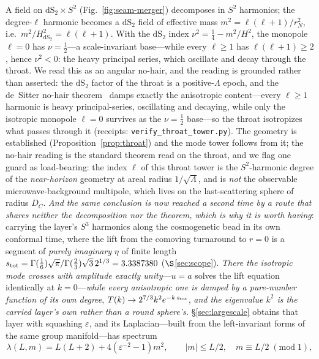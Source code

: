 \documentclass[11pt,a4paper]{article}
\theoremstyle{plain}
\theoremstyle{definition}
\theoremstyle{remark}
\newcommand{\dS}{\mathrm{dS}}
\begin{document}
A field on $\dS_2\times S^2$ (Fig.~\ref{fig:seam-merger}) decomposes in $S^2$ harmonics; the degree-$\ell$ harmonic becomes a $\dS_2$ field of effective mass $m^2=\ell(\ell+1)/r_{N}^2$, i.e.\ $m^2/H_{\dS_2}^2=\ell(\ell+1)$. With the $\dS_2$ index $\nu^2=\tfrac14-m^2/H^2$, the monopole $\ell=0$ has $\nu=\tfrac12$---a scale-invariant base---while every $\ell\ge1$ has $\ell(\ell+1)\ge2$, hence $\nu^2<0$: the heavy principal series, which oscillate and decay through the throat. We read this as an angular no-hair, and the reading is grounded rather than asserted: the $\dS_2$ factor of the throat is a positive-$\Lambda$ epoch, and the de~Sitter no-hair theorem~\cite{Wald1983} damps exactly the anisotropic content---every $\ell\ge1$ harmonic is heavy principal-series, oscillating and decaying, while only the isotropic monopole $\ell=0$ survives as the $\nu=\tfrac12$ base---so the throat isotropizes what passes through it (receipts: \texttt{verify\_throat\_tower.py}). The geometry is established (Proposition~\ref{prop:throat}) and the mode tower follows from it; the no-hair reading is the standard theorem read on the throat, and we flag one guard as load-bearing: the index $\ell$ of this throat tower is the $S^2$-harmonic degree of the \emph{near-horizon} geometry at areal radius $1/\sqrt\Lambda$, and is \emph{not} the observable microwave-background multipole, which lives on the last-scattering sphere of radius $D_C$. \emph{And the same conclusion is now reached a second time by a route that shares neither the decomposition nor the theorem, which is why it is worth having}: carrying the layer's $S^3$ harmonics along the cosmogenetic bead in its own conformal time, where the lift from the comoving turnaround to $r=0$ is a segment of \emph{purely imaginary} $\eta$ of finite length $s_{\rm tot}=\Gamma(\tfrac16)\sqrt\pi/\Gamma(\tfrac23)\sqrt3\,2^{1/3}=3.3387380$ ($\S$\ref{sec:scope}). \emph{There the isotropic mode crosses with amplitude exactly unity}---$u=a$ solves the lift equation identically at $k=0$---\emph{while every anisotropic one is damped by a pure-number function of its own degree}, $T(k)\to2^{7/3}k^2e^{-k\,s_{\rm tot}}$, \emph{and the eigenvalue $k^2$ is the carried layer's own rather than a round sphere's.} \S\ref{sec:largescale} obtains that layer with squashing $\varepsilon$, and its Laplacian---built from the left-invariant forms of the same group manifold---has spectrum
\begin{equation}
\lambda(L,m)=L(L+2)+4(\varepsilon^{-2}-1)m^2,\qquad |m|\le L/2,\quad m\equiv L/2 \;(\mathrm{mod}\;1),
\label{eq:squashed-spectrum}
\end{equation}
\end{document}
